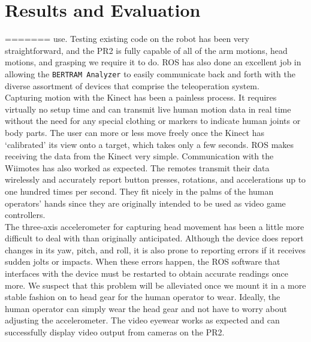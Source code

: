 \documentclass{sig-alternate}
\begin{document}
\section{Results and Evaluation}
=======
use. Testing existing code on the robot has been very straightforward, and 
the PR2 is fully capable of all of the arm motions, head motions, and grasping
we require it to do. ROS has also done an excellent job in allowing the 
{\tt BERTRAM Analyzer} to easily communicate back and forth with the diverse 
assortment of devices that comprise the teleoperation system.\\
\indent Capturing motion with the Kinect has been a painless process. It requires virtually no setup time and can transmit live human motion data in real time without the need for any special clothing or markers to indicate human joints or body parts. The user can more or less move freely once the Kinect has `calibrated' its view onto a target, which takes only a few seconds. ROS makes receiving the data from the Kinect very simple. Communication with the Wiimotes has also worked as expected. The remotes transmit their data wirelessly and accurately report button presses, rotations, and accelerations up to one hundred times per second. They fit nicely in the palms of the human operators' hands since they are originally intended to be used as video game controllers.\\
\indent The three-axis accelerometer for capturing head movement has been a little more difficult to deal with than originally anticipated. Although the device does report changes in its yaw, pitch, and roll, it is also prone to reporting errors if it receives sudden jolts or impacts. When these errors happen, the ROS software that interfaces with the device must be restarted to obtain accurate readings once more. We suspect that this problem will be alleviated once we mount it in a more stable fashion on to head gear for the human operator to wear. Ideally, the human operator can simply wear the head gear and not have to worry about adjusting the accelerometer. The video eyewear works as expected and can successfully display video output from cameras on the PR2.\\
\end{document}
